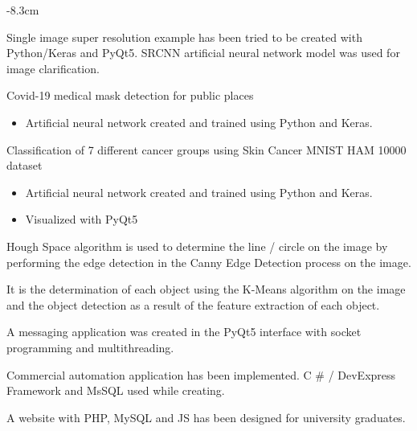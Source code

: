 \documentclass[10pt,a4paper]{altacv}
\begin{document}
\divider
\smallskip


\begin{adjustwidth}{}{-8.3cm}

Single image super resolution example has been tried to be created with Python/Keras and PyQt5. SRCNN artificial neural network model was used for image clarification.

\divider


Covid-19 medical mask detection for public places
\begin{itemize}
    \item Artificial neural network created and trained using Python and Keras.
\end{itemize}

\divider

Classification of 7 different cancer groups using Skin Cancer MNIST HAM 10000 dataset
\begin{itemize}
    \item Artificial neural network created and trained using Python and Keras.
    \item Visualized with PyQt5
\end{itemize}

\divider

Hough Space algorithm is used to determine the line / circle on the image by performing the edge detection in the Canny Edge Detection process on the image.


\divider

It is the determination of each object using the K-Means algorithm on the image and the object detection as a result of the feature extraction of each object.


\divider

A messaging application was created in the PyQt5 interface with socket programming and multithreading.

\divider

Commercial automation application has been implemented.
C \# / DevExpress Framework and MsSQL used while creating.

\divider

A website with PHP, MySQL and JS has been designed for university graduates.
\divider


\end{adjustwidth}
\end{document}
